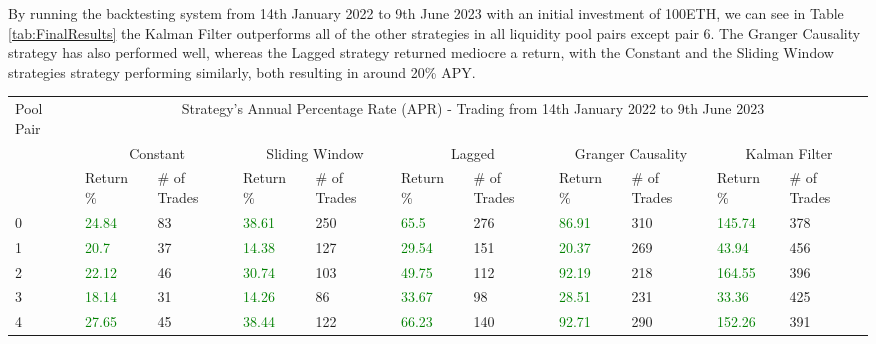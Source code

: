 \noindent By running the backtesting system from 14th January 2022 to 9th June 2023 with an initial investment of 100ETH, we can see in Table \ref{tab:FinalResults} the Kalman Filter outperforms all of the other strategies in all liquidity pool pairs except pair 6. The Granger Causality strategy has also performed well, whereas the Lagged strategy returned mediocre a return, with the Constant and the Sliding Window strategies strategy performing similarly, both resulting in around 20\% APY.
\\[3mm]
\begin{table}[H]
    \centering
    \begin{adjustwidth}{-0.8in}{-0.9in}
        \begin{tabular}{|p{4em}|p{3em}|p{3em}|p{3em}|p{3em}|p{3em}|p{3em}|p{3em}|p{3em}|p{3em}|p{3em}|}\hline
            Pool Pair & \multicolumn{10}{|c|}{Strategy's Annual Percentage Rate (APR) - Trading from 14th January 2022 to 9th June 2023} \\\cline{2-11}
            & \multicolumn{2}{|c|}{Constant} & \multicolumn{2}{|c|}{Sliding Window} & \multicolumn{2}{|c|}{Lagged} & \multicolumn{2}{|c|}{Granger Causality} & \multicolumn{2}{|c|}{Kalman Filter}\\\cline{2-11}
            & Return \% & \# of Trades & Return \% & \# of Trades & Return \% & \# of Trades & Return \% & \# of Trades & Return \% & \# of Trades\\\hline
            0 & \textcolor{green}{24.84} & 83 & \textcolor{green}{38.61} & 250 & \textcolor{green}{65.5} & 276 & \textcolor{green}{86.91} & 310 & \textcolor{green}{145.74} & 378\\\cline{2-11}
            1 & \textcolor{green}{20.7} & 37 & \textcolor{green}{14.38} & 127 & \textcolor{green}{29.54} & 151 & \textcolor{green}{20.37} & 269 & \textcolor{green}{43.94} & 456\\\cline{2-11}
            2 & \textcolor{green}{22.12} & 46 & \textcolor{green}{30.74} & 103 & \textcolor{green}{49.75} & 112 & \textcolor{green}{92.19} & 218 & \textcolor{green}{164.55} & 396\\\cline{2-11}
            3 & \textcolor{green}{18.14} & 31 & \textcolor{green}{14.26} & 86 & \textcolor{green}{33.67} & 98 & \textcolor{green}{28.51} & 231 & \textcolor{green}{33.36} & 425\\\cline{2-11}
            4 & \textcolor{green}{27.65} & 45 & \textcolor{green}{38.44} & 122 & \textcolor{green}{66.23} & 140 & \textcolor{green}{92.71} & 290 & \textcolor{green}{152.26} & 391\\\cline{2-11}

\end{tabular}
\end{adjustwidth}
\end{table}
